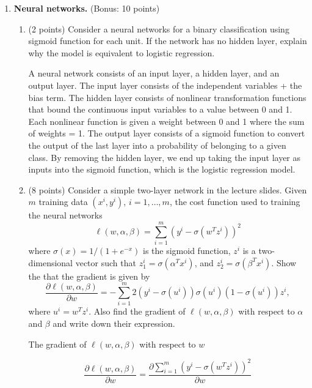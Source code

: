 \documentclass[twoside,10pt]{article}
\begin{document}
\begin{enumerate}
\vspace{5 mm}

\item {\bf Neural networks.} (Bonus: 10 points)

\begin{enumerate}
\item (2 points)
Consider a neural networks for a binary classification using sigmoid function for each unit. If the network has no hidden layer, explain why the model is equivalent to logistic regression. 

\vspace{5 mm}

A neural network consists of an input layer, a hidden layer, and an output layer.  The input layer consists of the independent variables + the bias term.  The hidden layer consists of nonlinear transformation functions that bound the continuous input variables to a value between 0 and 1.  Each nonlinear function is given a weight between 0 and 1 where the sum of weights = 1.  The output layer consists of a sigmoid function to convert the output of the last layer into a probability of belonging to a given class.  By removing the hidden layer, we end up taking the input layer as inputs into the sigmoid function, which is the logistic regression model.

\vspace{5 mm}

\item (8 points) 
Consider a simple two-layer network in the lecture slides. Given $m$ training data $(x^i, y^i)$, $i = 1, \ldots, m$, the cost function used to training the neural networks
\[
\ell(w, \alpha, \beta) = \sum_{i=1}^m (y^i - \sigma(w^T z^i))^2
\]
where $\sigma (x) = 1/(1+e^{-x})$ is the sigmoid function, $z^i$ is a two-dimensional vector such that  $z_1^i = \sigma(\alpha^T x^i)$, and $z_2^i = \sigma(\beta^T x^i)$. Show the that the gradient is given by
\[
\frac{\partial \ell(w, \alpha, \beta) }{\partial w}
= - \sum_{i=1}^m 2(y^i - \sigma(u^i))\sigma(u^i)(1-\sigma(u^i)) z^i,
\]
where $u^i = w^T z^i$. Also find the gradient of $\ell(w, \alpha, \beta)$ with respect to $\alpha$ and $\beta$ and write down their expression.

\vspace{5 mm}
The gradient of $\ell(w, \alpha, \beta)$ with respect to $w$

$$\frac{\partial \ell(w, \alpha, \beta) }{\partial w} = 
 \frac{\partial{\sum_{i=1}^m (y^i - \sigma(w^T z^i))^2}}{\partial{w}}$$
 

\end{enumerate}
\end{enumerate}
\end{document}
